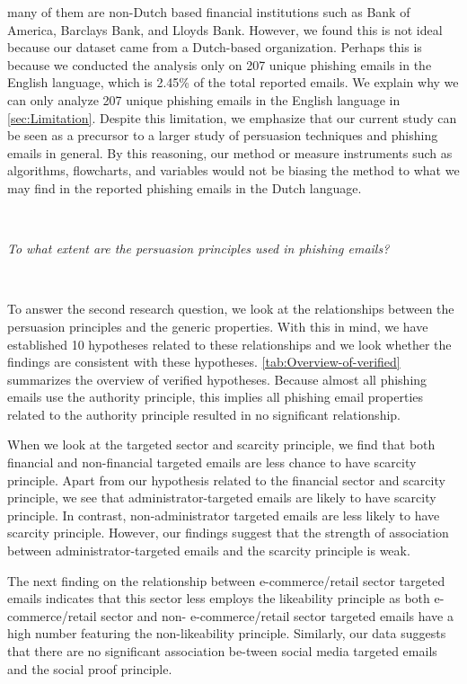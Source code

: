 many of them are non-Dutch based financial institutions such as Bank
of America, Barclays Bank, and Lloyds Bank. However, we found this
is not ideal because our dataset came from a Dutch-based organization.
Perhaps this is because we conducted the analysis only on 207 unique
phishing emails in the English language, which is 2.45\% of the total
reported emails. We explain why we can only analyze 207 unique phishing
emails in the English language in \autoref{sec:Limitation}. Despite
this limitation, we emphasize that our current study can be seen as
a precursor to a larger study of persuasion techniques and phishing
emails in general. By this reasoning, our method or measure instruments
such as algorithms, flowcharts, and variables would not be biasing
the method to what we may find in the reported phishing emails in
the Dutch language.

\ 

\textit{To what extent are the persuasion principles used in phishing
emails?}

\ 

To answer the second research question, we look at the relationships
between the persuasion principles and the generic properties. With
this in mind, we have established 10 hypotheses related to these relationships
and we look whether the findings are consistent with these hypotheses.
\autoref{tab:Overview-of-verified} summarizes the overview of verified
hypotheses. Because almost all phishing emails use the authority principle,
this implies all phishing email properties related to the authority
principle resulted in no significant relationship. 

When we look at the targeted sector and scarcity principle, we find
that both financial and non-financial targeted emails are less chance
to have scarcity principle. Apart from our hypothesis related to the
financial sector and scarcity principle, we see that administrator-targeted
emails are likely to have scarcity principle. In contrast, non-administrator
targeted emails are less likely to have scarcity principle. However,
our findings suggest that the strength of association between administrator-targeted
emails and the scarcity principle is weak. 

The next finding on the relationship between e-commerce/retail sector
targeted emails indicates that this sector less employs the likeability
principle as both e-commerce/retail sector and non- e-commerce/retail
sector targeted emails have a high number featuring the non-likeability
principle. Similarly, our data suggests that there are no significant
association be-tween social media targeted emails and the social proof
principle.


